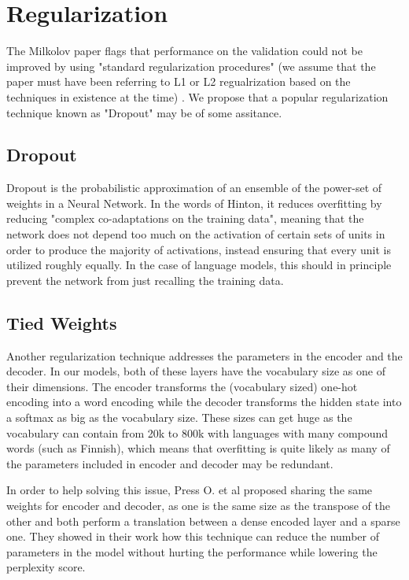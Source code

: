 \documentclass[a4paper]{article}
\begin{document}
\section{Regularization}
\label{sec:regularization}

The Milkolov paper flags that performance on the validation could not be
improved by using "standard regularization procedures" (we assume that
the paper must have been referring to L1 or L2 regualrization based on the
techniques in existence at the time) \cite{Milkolov10}. We propose that a
popular regularization technique known as "Dropout" may be of some assitance.

\subsection{Dropout}
\label{sec:dropout}

Dropout \cite{hinton2012} is the probabilistic approximation of an ensemble
of the power-set of weights in a Neural Network. In the words of Hinton, it
reduces overfitting by reducing "complex co-adaptations on the training data",
meaning that the network does not depend too much on the activation of
certain sets of units in order to produce the majority of activations, instead
ensuring that every unit is utilized roughly equally. In the case of language models,
this should in principle prevent the network from just recalling the training data.

\subsection{Tied Weights}
\label{sec:tiedweights}

Another regularization technique addresses the parameters in the encoder and the
decoder. In our models, both of these layers have the vocabulary size as one of
their dimensions. The encoder transforms the (vocabulary sized) one-hot encoding
into a word encoding while the decoder transforms the hidden state into a
softmax as big as the vocabulary size. These sizes can get huge as the
vocabulary can contain from 20k to 800k with languages with many compound words
(such as Finnish), which means that overfitting is quite likely as many of the
parameters included in encoder and decoder may be redundant.

In order to help solving this issue, Press O. et al \cite{press16} proposed
sharing the same weights for encoder and decoder, as one is the same size as the
transpose of the other and both perform a translation between a dense encoded
layer and a sparse one. They showed in their work how this technique can reduce
the number of parameters in the model without hurting the performance while
lowering the perplexity score.
\end{document}
